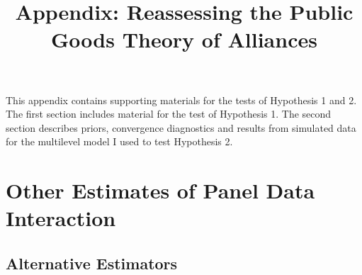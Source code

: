 \documentclass[12pt]{article}
\title{
\textbf{Appendix: Reassessing the Public Goods Theory of Alliances}
	}
\begin{document}
\maketitle 

\doublespace

This appendix contains supporting materials for the tests of Hypothesis 1 and 2. 
The first section includes material for the test of Hypothesis 1. 
The second section describes priors, convergence diagnostics and results from simulated data for the multilevel model I used to test Hypothesis 2. 

\section{Other Estimates of Panel Data Interaction}


\subsection{Alternative Estimators}
\end{document}
